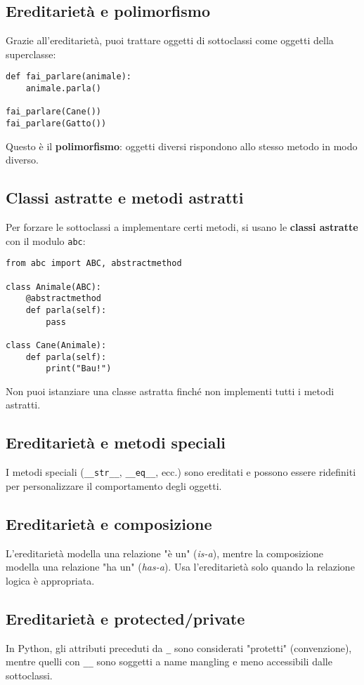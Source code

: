 \documentclass[a4paper,12pt]{article}
\begin{document}
\subsection*{Ereditarietà e polimorfismo}
Grazie all'ereditarietà, puoi trattare oggetti di sottoclassi come oggetti della superclasse:
\begin{lstlisting}
def fai_parlare(animale):
    animale.parla()

fai_parlare(Cane())
fai_parlare(Gatto())
\end{lstlisting}
Questo è il \textbf{polimorfismo}: oggetti diversi rispondono allo stesso metodo in modo diverso.

\subsection*{Classi astratte e metodi astratti}
Per forzare le sottoclassi a implementare certi metodi, si usano le \textbf{classi astratte} con il modulo \texttt{abc}:
\begin{lstlisting}
from abc import ABC, abstractmethod

class Animale(ABC):
    @abstractmethod
    def parla(self):
        pass

class Cane(Animale):
    def parla(self):
        print("Bau!")
\end{lstlisting}
Non puoi istanziare una classe astratta finché non implementi tutti i metodi astratti.

\subsection*{Ereditarietà e metodi speciali}
I metodi speciali (\texttt{\_\_str\_\_}, \texttt{\_\_eq\_\_}, ecc.) sono ereditati e possono essere ridefiniti per personalizzare il comportamento degli oggetti.

\subsection*{Ereditarietà e composizione}
L'ereditarietà modella una relazione "è un" (\textit{is-a}), mentre la composizione modella una relazione "ha un" (\textit{has-a}). Usa l'ereditarietà solo quando la relazione logica è appropriata.

\subsection*{Ereditarietà e protected/private}
In Python, gli attributi preceduti da \texttt{\_} sono considerati "protetti" (convenzione), mentre quelli con \texttt{\_\_} sono soggetti a name mangling e meno accessibili dalle sottoclassi.
\end{document}
